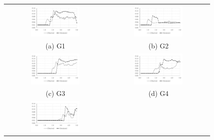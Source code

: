 \begin{figure}[tpb]
	\centering
	\begin{tabular}{cc}
		\includegraphics[width=0.5\textwidth]{numerical-test-figures/dam-break-obstacle-results-g1.pdf} &
		\includegraphics[width=0.5\textwidth]{numerical-test-figures/dam-break-obstacle-results-g2.pdf} \\
		(a) G1 &
		(b) G2 \\[6pt]
		\includegraphics[width=0.5\textwidth]{numerical-test-figures/dam-break-obstacle-results-g3.pdf} &
		\includegraphics[width=0.5\textwidth]{numerical-test-figures/dam-break-obstacle-results-g4.pdf} \\
		(c) G3 &
		(d) G4 \\[6pt]
		\includegraphics[width=0.5\textwidth]{numerical-test-figures/dam-break-obstacle-results-g5.pdf} &

\end{tabular}
\end{figure}
